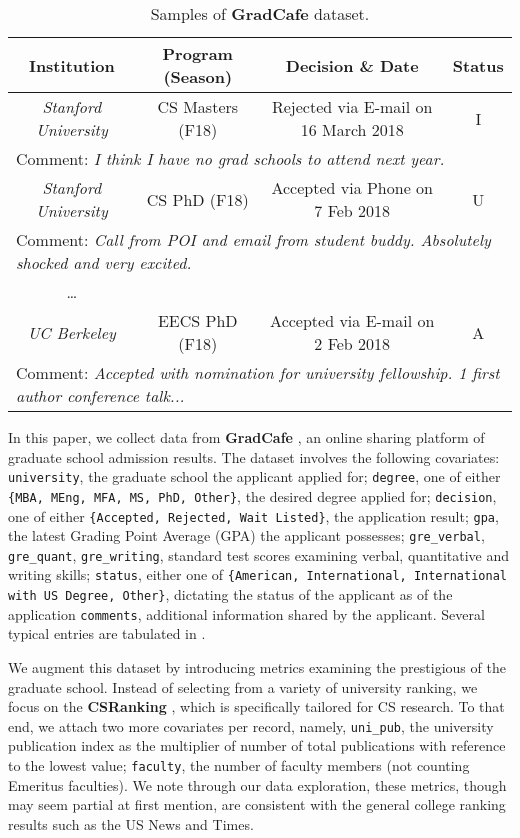 \documentclass{article}
\newcommand{\noun}[1]{\textbf{#1}}
\newcommand{\var}[1]{\texttt{#1}}
\begin{document}
	\begin{table}[htpb]
	    \centering
	    \begin{tabular}{cccc}
		Institution & Program (Season) & Decision \& Date & Status \\\hline\hline
		\emph{Stanford University} & CS Masters (F18) & Rejected via E-mail on 16 March 2018 & I \\
		\multicolumn{4}{l}{Comment: \emph{I think I have no grad schools to attend next year.}}\\
		\emph{Stanford University} & CS PhD (F18) & Accepted via Phone on 7 Feb 2018 & U \\
		\multicolumn{4}{l}{Comment: \emph{Call from POI and email from student buddy. Absolutely shocked and very excited.}}\\
		\ldots\\
		\emph{UC Berkeley} & EECS PhD (F18) & Accepted via E-mail on 2 Feb 2018 & A \\
		\multicolumn{4}{l}{Comment: \emph{Accepted with nomination for university fellowship. 1 first author conference talk...}}\\ \hline\hline
	    \end{tabular}
	    \caption{Samples of \noun{GradCafe} dataset.}
	    \label{table:data_sample}
	\end{table}
	In this paper, we collect data from \noun{GradCafe} \cite{GradCafe}, an online
	sharing platform of graduate school admission results. The dataset
	involves the following covariates:
	\var{university}, the graduate school the applicant applied for;
	\var{degree}, one of either \var{\{MBA, MEng, MFA, MS, PhD, Other\}}, the desired degree applied for;
	\var{decision}, one of either \var{\{Accepted, Rejected, Wait Listed\}}, the application result;
	\var{gpa}, the latest Grading Point Average (GPA) the applicant possesses;
	\var{gre\_verbal}, \var{gre\_quant}, \var{gre\_writing}, standard test scores examining verbal, quantitative and writing skills;
	\var{status}, either one of \var{\{American, International, International with US Degree,
	Other\}}, dictating the status of the applicant as of the application
	\var{comments}, additional information shared by the applicant. Several
	typical entries are tabulated in .

	We augment this dataset by introducing metrics examining the prestigious of the graduate
	school. Instead of selecting from a variety of university ranking, we focus on the \noun{CSRanking} \cite{CSR},
	which is specifically tailored for CS research. To that end, we attach two more covariates per record,
	namely,
	\var{uni\_pub}, the university publication index as the multiplier of number of total publications with reference
	to the lowest value;
	\var{faculty}, the number of faculty members (not counting Emeritus faculties).
	We note through our data exploration, these metrics, though may seem partial at first mention,
	are consistent with the general college ranking results such as
	the US News and Times.
\end{document}
